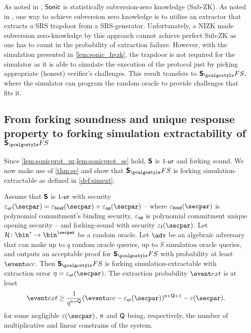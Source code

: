 \documentclass[runningheads,11pt]{llncs}
\begin{document}
\begin{remark} 
  As noted in \cite{CCS:MBKM19}, ${\textnormal{\textsf{Sonic}}}$ is statistically subversion-zero
  knowledge (Sub-ZK). As noted in \cite{AC:ABLZ17}, one way to achieve
  subversion zero knowledge is to utilise an extractor that extracts a SRS
  trapdoor from a SRS-generator. Unfortunately, a NIZK made subversion
  zero-knowledge by this approach cannot achieve perfect Sub-ZK as one has to
  count in the probability of extraction failure. However, with the simulation
  presented in \cref{lem:sonic_hvzk}, the trapdoor is not required for the
  simulator as it is able to simulate the execution of the protocol just by
  picking appropriate (honest) verifier's challenges. This result transfers to
  $\sonicprotfs$, where the simulator can program the random oracle to provide
  challenges that fits it.
\end{remark}

\subsection{From forking soundness and unique response property to forking
  simulation extractability of $\sonicprotfs$}
Since \cref{lem:sonicprot_ur,lem:sonicprot_ss} hold, $\bm{\mathsf{S}}$ is ${1\text{-}\mathsf{ur}}$
and forking sound. We now make use
of \cref{thm:se} and show that $\sonicprotfs$ is forking simulation-extractable as defined in \cref{def:simext}.

\begin{corollary}
  \label{thm:sonicprotfs_se}
  Assume that $\bm{\mathsf{S}}$ is ${1\text{-}\mathsf{ur}}$ with security
  $\epsur(\secpar) = \epsbind(\secpar) + \epsop(\secpar)$ -- where
  $\epsbind (\secpar)$ is polynomial commitment's binding security, $\varepsilon_{\mathsf{op}}$ is
  polynomial commitment unique opening security -- and forking-sound with
  security $\epsss(\secpar)$. Let $\ro\colon \bin^* \to \bin^\secpar$ be a
  random oracle. Let $\advse$ be an algebraic adversary that can make up to $q$
  random oracle queries, up to $S$ simulation oracle queries, and outputs an
  acceptable proof for $\sonicprotfs$ with probability at least $\accProb$. Then
  $\sonicprotfs$ is forking simulation-extractable with extraction error
  $\eta = \epsur(\secpar)$. The extraction probability $\extProb$ is at least
\[
		\extProb  \geq \frac{1}{q^{\multconstr + \linconstr}} (\accProb - \epsur(\secpar))^{\multconstr +
		\linconstr + 1} - \eps(\secpar).
	\]
	for some negligible $\eps(\secpar)$, $\mathsf{n}$ and $\mathsf{Q}$ being,
  respectively, the number of multiplicative and linear constrains of the system.
\end{corollary}
\end{document}
